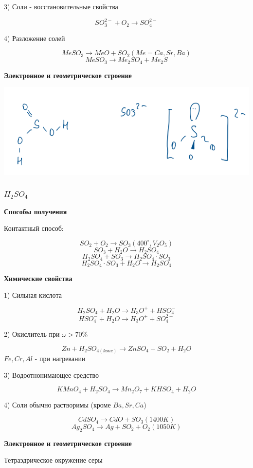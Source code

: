 3) Соли - восстановительные свойства

$$SO_3^{2-} + O_2 \rightarrow  SO_4^{2-}$$

4) Разложение солей

$$MeSO_3 \rightarrow MeO + SO_2 (Me = Ca, Sr, Ba)$$
$$MeSO_3 \rightarrow Me_2SO_4 + Me_2S$$

\textbf{Электронное и геометрическое строение}

\includegraphics{images/7v6.png}

\subsubsection*{$H_2SO_4$}

\textbf{Способы получения}

Контактный способ:

$$SO_2 + O_2 \rightarrow SO_3(400^{\circ}, V_2O_5)$$
$$SO_3 + H_2O \rightarrow H_2SO_4$$
$$H_2SO_4 + SO_3 \rightarrow H_2SO_4\cdot SO_3$$
$$H_2SO_4\cdot SO_3 +H_2O \rightarrow H_2SO_4$$

\textbf{Химические свойства}

1) Сильная кислота

$$H_2SO_4 + H_2O \rightarrow H_3O^+ + HSO_4^-$$
$$HSO_4^- + H_2O \rightarrow H_3O^+ + SO_4^{2-}$$

2) Окислитель при $\omega > 70\%$

$$Zn + H_2SO_{4(konc)} \rightarrow ZnSO_4 + SO_2 + H_2O$$
$Fe,Cr, Al$ - при нагревании

3) Водоотнонимающее средство

$$KMnO_4 + H_2SO_4 \rightarrow Mn_2O_7 + KHSO_4 + H_2O$$

4) Соли обычно растворимы (кроме $Ba, Sr, Ca$)

$$CdSO_4 \rightarrow CdO + SO_3 (1400K)$$
$$Ag_2SO_4 \rightarrow Ag + SO_2 + O_2 (1050K)$$

\textbf{Электронное и геометрическое строение}

Тетраэдрическое окружение серы

